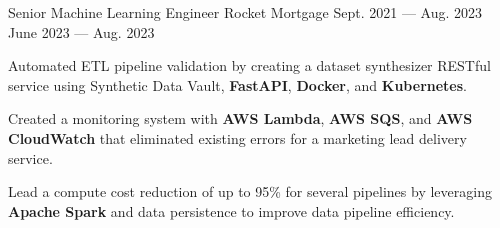 
\vspace{-0.2cm}
\begin{cventries}
  \cventry
    {Senior Machine Learning Engineer} %
    {Rocket Mortgage} %
    {Sept. 2021 --- Aug. 2023} %
    {June 2023 --- Aug. 2023} %
    {
      \vspace{-0.1cm}
      \begin{cvitems} %
        \item Automated ETL pipeline validation by creating a dataset synthesizer RESTful service using Synthetic Data Vault, \textbf{FastAPI}, \textbf{Docker}, and \textbf{Kubernetes}.
        \item Created a monitoring system with \textbf{AWS Lambda}, \textbf{AWS SQS}, and \textbf{AWS CloudWatch} that eliminated existing errors for a marketing lead delivery service.
        \item Lead a compute cost reduction of up to 95\% for several pipelines by leveraging \textbf{Apache Spark} and data persistence to improve data pipeline efficiency.
      \end{cvitems}
    }
  \vspace{-.2cm}


\end{cventries}

